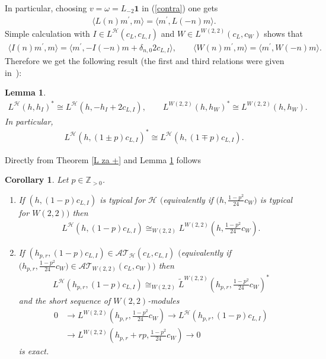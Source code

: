 \documentclass[pdftex]{sigma}
\numberwithin{equation}{section}
\newtheorem{Corollary}[Theorem]{Corollary}
\newtheorem{Lemma}[Theorem]{Lemma}
\newcommand{\N}{{\mathbb Z}_{> 0} }
\newcommand{\HVir}{\mathcal H}
\begin{document}
In particular, choosing $v=\omega =L_{-2}\boldsymbol{1}$ in (\ref{contra}) one gets
\begin{gather*}
\langle L(n) m^{\prime },m\rangle =\langle m^{\prime },L(-n) m\rangle .
\end{gather*}
Simple calculation with $I\in L^{\HVir}(c_{L},c_{L,I}) $ and $W\in L^{W(2,2) } ( c_{L},c_{W} ) $ shows that
\begin{gather*}
\langle I(n) m^{\prime },m\rangle = \langle m^{\prime },-I(-n) m+\delta _{n,0}2c_{L,I} \rangle , \qquad
\langle W(n) m^{\prime },m\rangle =\langle m^{\prime },W(-n) m\rangle .
\end{gather*}
Therefore we get the following result (the f\/irst and third relations were given in~\cite{nas}):

\begin{Lemma}\label{duali}
\begin{gather*}
L^{\HVir}(h,h_{I})^{\ast} \cong L^{\HVir}(h,-h_{I}+2c_{L,I}),\qquad
L^{W(2,2) }(h,h_{W})^{\ast} \cong L^{W(2,2) }(h,h_{W}) .
\end{gather*}
In particular,
\begin{gather*}
L^{\HVir}(h,(1\pm p) c_{L,I})^{\ast}\cong L^{\HVir}(h,(1\mp p) c_{L,I}).
\end{gather*}
\end{Lemma}

Directly from Theorem \ref{L za +} and Lemma \ref{duali} follows

\begin{Corollary}\label{L za -}Let $p \in \N $.
\begin{enumerate}\itemsep=0pt
\item[$(i)$] If $(h,(1-p) c_{L,I})$ is typical for $\HVir$ $($equivalently if $\big( h,\frac{1-p^{2}}{24}c_{W}\big) $ is typical for $W(2,2))$ then
\begin{gather*}
L^{\HVir} ( h,(1-p) c_{L,I} ) \cong_{W(2,2) }L^{W(2,2)}\left( h,\frac{1-p^{2}}{24}c_{W}\right) .
\end{gather*}

\item[$(ii)$] If $(h_{p,r},(1-p) c_{L,I}) \in {\mathcal {AT} }_{\HVir} ( c_L, c_{L,I} )$ $($equivalently if $ \big(h_{p,r},\frac{1-p^{2}}{24}c_{W}\big) \in {\mathcal {AT} }_{W(2,2)} ( c_L, c_W ) )$ then
\begin{gather*}
L^{\HVir} ( h_{p,r},(1-p) c_{L,I} ) \cong_{W(2,2) }\widetilde{L}^{W(2,2)}\left( h_{p,r},\frac{1-p^{2}}{24}c_{W}\right) ^{\ast}
\end{gather*}
and the short sequence of $W(2,2)$-modules
\begin{align*}
0 & \rightarrow L^{W(2,2)}\left( h_{p,r},\frac{1-p^{2}}{24}c_{W}\right)
\rightarrow L^{\HVir}\left( h_{p,r},(1-p) c_{L,I}\right) \\ %
& \rightarrow L^{W(2,2)}\left( h_{p,r}+rp,\frac{1-p^{2}}{24}c_{W}\right)
\rightarrow0 \nonumber
\end{align*}
is exact.
\end{enumerate}
\end{Corollary}
\end{document}
